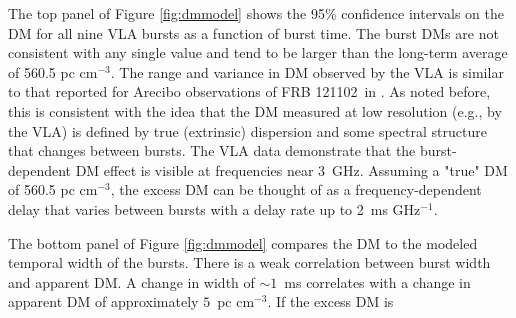 \documentclass[twocolumn]{aastex61}
\newcommand{\frb}{FRB 121102}
\begin{document}
The top panel of Figure \ref{fig:dmmodel} shows the 95\% confidence intervals on the DM for all nine VLA bursts as a function of burst time. The burst DMs are not consistent with any single value and tend to be larger than the long-term average of 560.5 pc cm$^{-3}$. The range and variance in DM observed by the VLA is similar to that reported for Arecibo observations of \frb\ in \citet{2016arXiv160308880S}. As noted before, this is consistent with the idea that the DM measured at low resolution (e.g., by the VLA) is defined by true (extrinsic) dispersion and some spectral structure that changes between bursts. The VLA data demonstrate that the burst-dependent DM effect is visible at frequencies near 3~GHz. Assuming a "true" DM of 560.5 pc cm$^{-3}$, the excess DM can be thought of as a frequency-dependent delay that varies between bursts with a delay rate up to 2~ms GHz$^{-1}$.

The bottom panel of Figure \ref{fig:dmmodel} compares the DM to the modeled temporal width of the bursts. There is a weak correlation between burst width and apparent DM. A change in width of $\sim1$~ms correlates with a change in apparent DM of approximately $5$~pc cm$^{-3}$. If the excess DM is 
\end{document}
